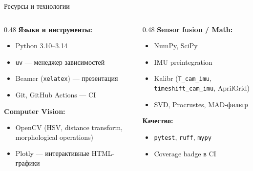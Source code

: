\documentclass[aspectratio=169]{beamer}
\newcommand{\code}[1]{\texttt{#1}}
\begin{document}
\begin{frame}{Ресурсы и технологии}
    \begin{columns}[t]
        \begin{column}{0.48\textwidth}
            \textbf{Языки и инструменты:}
            \begin{itemize}
                \item Python 3.10--3.14
                \item \code{uv} --- менеджер зависимостей
                \item Beamer (\code{xelatex}) --- презентация
                \item Git, GitHub Actions --- CI
            \end{itemize}

            \vspace{0.4em}
            \textbf{Computer Vision:}
            \begin{itemize}
                \item OpenCV (HSV, distance transform, morphological operations)
                \item Plotly --- интерактивные HTML-графики
            \end{itemize}
        \end{column}
        \begin{column}{0.48\textwidth}
            \textbf{Sensor fusion / Math:}
            \begin{itemize}
                \item NumPy, SciPy
                \item IMU preintegration
                \item Kalibr (\code{T\_cam\_imu}, \code{timeshift\_cam\_imu}, AprilGrid)
                \item SVD, Procrustes, MAD-фильтр
            \end{itemize}

            \vspace{0.4em}
            \textbf{Качество:}
            \begin{itemize}
                \item \code{pytest}, \code{ruff}, \code{mypy}
                \item Coverage badge в CI
            \end{itemize}
        \end{column}
    \end{columns}
\end{frame}
\end{document}
